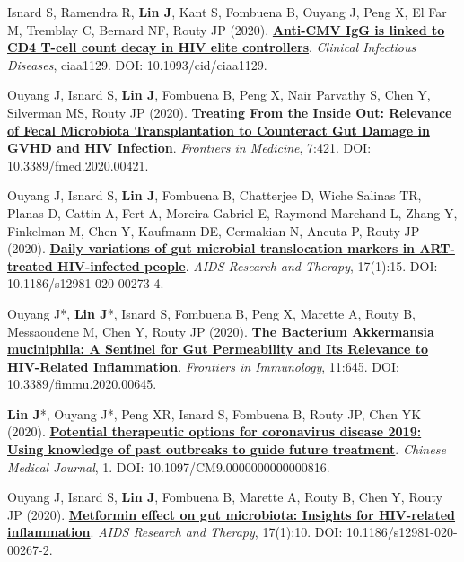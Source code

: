 \documentclass[letterpaper,11pt]{article}
\newcounter{journalCounter}
\newcommand{\jref}{%
    \stepcounter{journalCounter}%
    \textbf{[J.\thejournalCounter]}%
}
\begin{document}
\item[\jref] Isnard S, Ramendra R, \textbf{Lin J}, Kant S, Fombuena B, Ouyang J, Peng X, El Far M, Tremblay C, Bernard NF, Routy JP (2020). \href{https://doi.org/10.1093/cid/ciaa1129}{\textbf{Anti-CMV IgG is linked to CD4 T-cell count decay in HIV elite controllers}}. \textit{Clinical Infectious Diseases}, ciaa1129. DOI: 10.1093/cid/ciaa1129.

\item[\jref] Ouyang J, Isnard S, \textbf{Lin J}, Fombuena B, Peng X, Nair Parvathy S, Chen Y, Silverman MS, Routy JP (2020). \href{https://doi.org/10.3389/fmed.2020.00421}{\textbf{Treating From the Inside Out: Relevance of Fecal Microbiota Transplantation to Counteract Gut Damage in GVHD and HIV Infection}}. \textit{Frontiers in Medicine}, 7:421. DOI: 10.3389/fmed.2020.00421.

\item[\jref] Ouyang J, Isnard S, \textbf{Lin J}, Fombuena B, Chatterjee D, Wiche Salinas TR, Planas D, Cattin A, Fert A, Moreira Gabriel E, Raymond Marchand L, Zhang Y, Finkelman M, Chen Y, Kaufmann DE, Cermakian N, Ancuta P, Routy JP (2020). \href{https://doi.org/10.1186/s12981-020-00273-4}{\textbf{Daily variations of gut microbial translocation markers in ART-treated HIV-infected people}}. \textit{AIDS Research and Therapy}, 17(1):15. DOI: 10.1186/s12981-020-00273-4.

\item[\jref] Ouyang J*, \textbf{Lin J}*, Isnard S, Fombuena B, Peng X, Marette A, Routy B, Messaoudene M, Chen Y, Routy JP (2020). \href{https://doi.org/10.3389/fimmu.2020.00645}{\textbf{The Bacterium Akkermansia muciniphila: A Sentinel for Gut Permeability and Its Relevance to HIV-Related Inflammation}}. \textit{Frontiers in Immunology}, 11:645. DOI: 10.3389/fimmu.2020.00645.

\item[\jref] \textbf{Lin J}*, Ouyang J*, Peng XR, Isnard S, Fombuena B, Routy JP, Chen YK (2020). \href{https://doi.org/10.1097/CM9.0000000000000816}{\textbf{Potential therapeutic options for coronavirus disease 2019: Using knowledge of past outbreaks to guide future treatment}}. \textit{Chinese Medical Journal}, 1. DOI: 10.1097/CM9.0000000000000816.

\item[\jref] Ouyang J, Isnard S, \textbf{Lin J}, Fombuena B, Marette A, Routy B, Chen Y, Routy JP (2020). \href{https://doi.org/10.1186/s12981-020-00267-2}{\textbf{Metformin effect on gut microbiota: Insights for HIV-related inflammation}}. \textit{AIDS Research and Therapy}, 17(1):10. DOI: 10.1186/s12981-020-00267-2.
\end{document}

